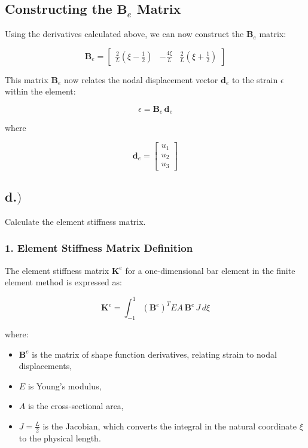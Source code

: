 \documentclass{article}
\begin{document}
\subsection*{Constructing the \( \mathbf{B}_e \) Matrix}

Using the derivatives calculated above, we can now construct the \( \mathbf{B}_e \) matrix:

\begin{equation}
    \mathbf{B}_e = \begin{bmatrix} \frac{2}{L} \left( \xi - \frac{1}{2} \right) & -\frac{4\xi}{L} & \frac{2}{L} \left( \xi + \frac{1}{2} \right) \end{bmatrix}
\end{equation}

This matrix \( \mathbf{B}_e \) now relates the nodal displacement vector \( \mathbf{d}_e \) to the strain \( \epsilon \) within the element:

\begin{equation}
    \epsilon = \mathbf{B}_e \, \mathbf{d}_e
\end{equation}

where

\[
\mathbf{d}_e = \begin{bmatrix} u_1 \\ u_2 \\ u_3 \end{bmatrix}
\]

\newpage
\subsection*{d.$)$}
Calculate the element stiffness matrix.


\subsubsection*{1. Element Stiffness Matrix Definition}

The element stiffness matrix \( \mathbf{K}^e \) for a one-dimensional bar element in the finite element method is expressed as:

\begin{equation}
    \mathbf{K}^e = \int_{-1}^{1} (\mathbf{B}^e)^T E A \, \mathbf{B}^e \, J \, d\xi
\end{equation}

where:
\begin{itemize}
    \item \( \mathbf{B}^e \) is the matrix of shape function derivatives, relating strain to nodal displacements,
    \item \( E \) is Young’s modulus,
    \item \( A \) is the cross-sectional area,
    \item \( J = \frac{L}{2} \) is the Jacobian, which converts the integral in the natural coordinate \( \xi \) to the physical length.
\end{itemize}
\end{document}
